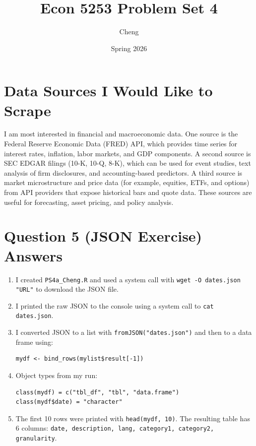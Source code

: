 \documentclass[11pt]{article}
\title{Econ 5253 Problem Set 4}
\author{Cheng}
\date{Spring 2026}
\begin{document}
\maketitle

\section*{Data Sources I Would Like to Scrape}
I am most interested in financial and macroeconomic data. One source is the
Federal Reserve Economic Data (FRED) API, which provides time series for
interest rates, inflation, labor markets, and GDP components. A second source
is SEC EDGAR filings (10-K, 10-Q, 8-K), which can be used for event studies,
text analysis of firm disclosures, and accounting-based predictors. A third
source is market microstructure and price data (for example, equities, ETFs, and
options) from API providers that expose historical bars and quote data. These
sources are useful for forecasting, asset pricing, and policy analysis.

\section*{Question 5 (JSON Exercise) Answers}
\begin{enumerate}
  \item I created \texttt{PS4a\_Cheng.R} and used a system call with
  \texttt{wget -O dates.json "URL"} to download the JSON file.

  \item I printed the raw JSON to the console using a system call to
  \texttt{cat dates.json}.

  \item I converted JSON to a list with \texttt{fromJSON("dates.json")} and
  then to a data frame using:
\begin{verbatim}
mydf <- bind_rows(mylist$result[-1])
\end{verbatim}

  \item Object types from my run:
\begin{verbatim}
class(mydf) = c("tbl_df", "tbl", "data.frame")
class(mydf$date) = "character"
\end{verbatim}

  \item The first 10 rows were printed with \texttt{head(mydf, 10)}.
  The resulting table has 6 columns:
  \texttt{date, description, lang, category1, category2, granularity}.
\end{enumerate}
\end{document}
